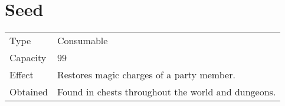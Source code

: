 \section{Seed}
\label{item:seed}


\noindent\begin{tabularx}{\textwidth}[l]{lX}
	Type
	& Consumable
\\
	Capacity
	& 99
\\
	Effect
	& Restores magic charges of a party member.
\\
	Obtained
	& Found in chests throughout the world and dungeons.
\end{tabularx}
